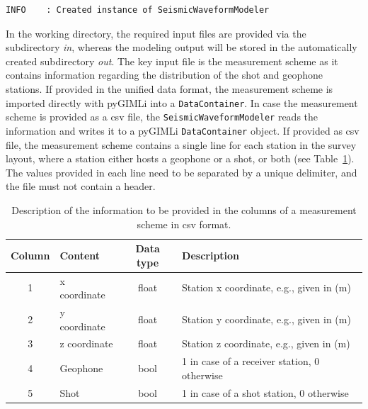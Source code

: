 \documentclass[a4paper,fleqn]{cas-sc}
\begin{document}
\begin{footnotesize}
\begin{verbatim}
INFO    : Created instance of SeismicWaveformModeler
\end{verbatim}
\end{footnotesize}

In the working directory, the required input files are provided via the subdirectory \textit{in}, whereas the modeling output will be stored in the automatically created subdirectory \textit{out}. The key input file is the measurement scheme as it contains information regarding the distribution of the shot and geophone stations. If provided in the unified data format, the measurement scheme is imported directly with pyGIMLi into a \texttt{DataContainer}. In case the measurement scheme is provided as a csv file, the \texttt{SeismicWaveformModeler} reads the information and writes it to a pyGIMLi \texttt{DataContainer} object. If provided as csv file, the measurement scheme contains a single line for each station in the survey layout, where a station either hosts a geophone or a shot, or both (see Table~\ref{tab:scheme}). The values provided in each line need to be separated by a unique delimiter, and the file must not contain a header.
\begin{table}%
    \caption{Description of the information to be provided in the columns of a measurement scheme in csv format.}
    \centering
    \begin{tabular}{clcl}
        \toprule
        Column & \textbf{Content} & \textbf{Data type} & \textbf{Description} \\
        \midrule
        1 & x coordinate & float & Station x coordinate, e.g., given in (m) \\ 
        2 & y coordinate & float & Station y coordinate, e.g., given in (m) \\ 
        3 & z coordinate & float & Station z coordinate, e.g., given in (m) \\ 
        4 & Geophone & bool & 1 in case of a receiver station, 0 otherwise \\ 
        5 & Shot & bool & 1 in case of a shot station, 0 otherwise \\
        \bottomrule
    \end{tabular}
    \label{tab:scheme}
\end{table}
%
\end{document}
